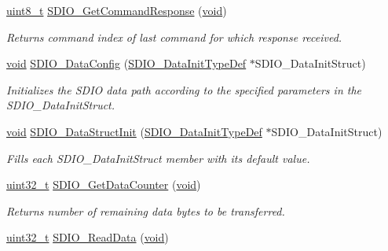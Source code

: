 \begin{DoxyCompactItemize}
\hyperlink{_p_e___types_8h_aba7bc1797add20fe3efdf37ced1182c5}{uint8\+\_\+t} \hyperlink{group___s_d_i_o___exported___functions_ga9badf271c818e09da301d715c4ad0e5b}{S\+D\+I\+O\+\_\+\+Get\+Command\+Response} (\hyperlink{usb__devapi_8h_afabf60e7f57651d6d595a02c75f07cd0}{void})
\begin{DoxyCompactList}\small\item\em Returns command index of last command for which response received. \end{DoxyCompactList}\item 
\hyperlink{usb__devapi_8h_afabf60e7f57651d6d595a02c75f07cd0}{void} \hyperlink{group___s_d_i_o___exported___functions_gad65d896ae919683585bda44a1e2afae4}{S\+D\+I\+O\+\_\+\+Data\+Config} (\hyperlink{struct_s_d_i_o___data_init_type_def}{S\+D\+I\+O\+\_\+\+Data\+Init\+Type\+Def} $\ast$S\+D\+I\+O\+\_\+\+Data\+Init\+Struct)
\begin{DoxyCompactList}\small\item\em Initializes the S\+D\+IO data path according to the specified parameters in the S\+D\+I\+O\+\_\+\+Data\+Init\+Struct. \end{DoxyCompactList}\item 
\hyperlink{usb__devapi_8h_afabf60e7f57651d6d595a02c75f07cd0}{void} \hyperlink{group___s_d_i_o___exported___functions_gaa83209c09e921521aca2587fb5b22ea2}{S\+D\+I\+O\+\_\+\+Data\+Struct\+Init} (\hyperlink{struct_s_d_i_o___data_init_type_def}{S\+D\+I\+O\+\_\+\+Data\+Init\+Type\+Def} $\ast$S\+D\+I\+O\+\_\+\+Data\+Init\+Struct)
\begin{DoxyCompactList}\small\item\em Fills each S\+D\+I\+O\+\_\+\+Data\+Init\+Struct member with its default value. \end{DoxyCompactList}\item 
\hyperlink{_p_e___types_8h_a33594304e786b158f3fb30289278f5af}{uint32\+\_\+t} \hyperlink{group___s_d_i_o___exported___functions_ga7a28aaa2c25a9a5a8db1f49b0e8c9d0a}{S\+D\+I\+O\+\_\+\+Get\+Data\+Counter} (\hyperlink{usb__devapi_8h_afabf60e7f57651d6d595a02c75f07cd0}{void})
\begin{DoxyCompactList}\small\item\em Returns number of remaining data bytes to be transferred. \end{DoxyCompactList}\item 
\hyperlink{_p_e___types_8h_a33594304e786b158f3fb30289278f5af}{uint32\+\_\+t} \hyperlink{group___s_d_i_o___exported___functions_ga4e8ac755ef3c31ecd4ed2708df19187e}{S\+D\+I\+O\+\_\+\+Read\+Data} (\hyperlink{usb__devapi_8h_afabf60e7f57651d6d595a02c75f07cd0}{void})

\end{DoxyCompactItemize}
